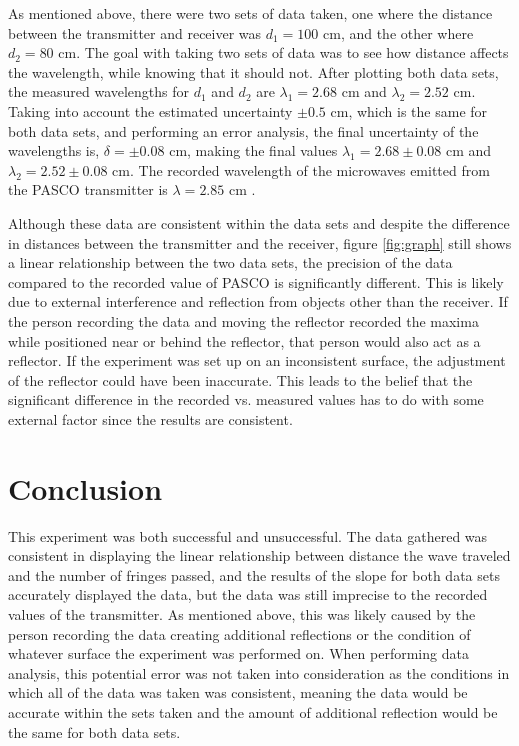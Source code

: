 \documentclass[rc]{physicsinprogress}
\begin{document}
    As mentioned above, there were two sets of data taken, one where the distance between the transmitter and receiver was $d_1=100$ cm, and the other where $d_2=80$ cm. The goal with taking two sets of data was to see how distance affects the wavelength, while knowing that it should not. After plotting both data sets, the measured wavelengths for $d_1$ and $d_2$ are $\lambda_1=2.68$ cm and $\lambda_2=2.52$ cm. Taking into account the estimated uncertainty $\pm0.5$ cm, which is the same for both data sets, and performing an error analysis, the final uncertainty of the wavelengths is, $\delta=\pm0.08$ cm, making the final values $\lambda_1=2.68\pm0.08$ cm and $\lambda_2=2.52\pm0.08$ cm. The recorded wavelength of the microwaves emitted from the PASCO transmitter is $\lambda=2.85$ cm \cite{griffith}.
    
    Although these data are consistent within the data sets and despite the difference in distances between the transmitter and the receiver, figure \ref{fig:graph} still shows a linear relationship between the two data sets, the precision of the data compared to the recorded value of PASCO is significantly different. This is likely due to external interference and reflection from objects other than the receiver. If the person recording the data and moving the reflector recorded the maxima while positioned near or behind the reflector, that person would also act as a reflector. If the experiment was set up on an inconsistent surface, the adjustment of the reflector could have been inaccurate. This leads to the belief that the significant difference in the recorded vs. measured values has to do with some external factor since the results are consistent.


\section{Conclusion}
    This experiment was both successful and unsuccessful. The data gathered was consistent in displaying the linear relationship between distance the wave traveled and the number of fringes passed, and the results of the slope for both data sets accurately displayed the data, but the data was still imprecise to the recorded values of the transmitter. As mentioned above, this was likely caused by the person recording the data creating additional reflections or the condition of whatever surface the experiment was performed on. When performing data analysis, this potential error was not taken into consideration as the conditions in which all of the data was taken was consistent, meaning the data would be accurate within the sets taken and the amount of additional reflection would be the same for both data sets.
\end{document}
